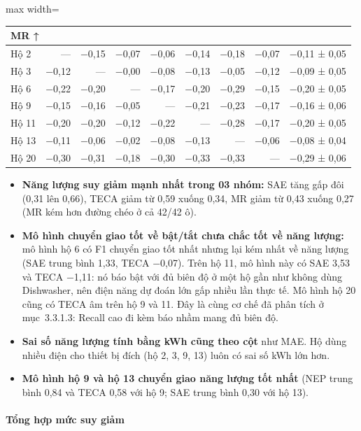 \begin{table}[H]
\begin{adjustbox}{max width=\linewidth}
\begin{tabular}{|l|r|r|r|r|r|r|r|r|}
\multicolumn{9}{|l|}{\textbf{MR ↑}} \\ \hline
Hộ 2 & — & −0,15 & −0,07 & −0,06 & −0,14 & −0,18 & −0,07 & −0,11 ± 0,05 \\ \hline
Hộ 3 & −0,12 & — & −0,00 & −0,08 & −0,13 & −0,05 & −0,12 & −0,09 ± 0,05 \\ \hline
Hộ 6 & −0,22 & −0,20 & — & −0,17 & −0,20 & −0,29 & −0,15 & −0,20 ± 0,05 \\ \hline
Hộ 9 & −0,15 & −0,16 & −0,05 & — & −0,21 & −0,23 & −0,17 & −0,16 ± 0,06 \\ \hline
Hộ 11 & −0,20 & −0,20 & −0,12 & −0,22 & — & −0,28 & −0,17 & −0,20 ± 0,05 \\ \hline
Hộ 13 & −0,11 & −0,06 & −0,02 & −0,08 & −0,13 & — & −0,06 & −0,08 ± 0,04 \\ \hline
Hộ 20 & −0,30 & −0,31 & −0,18 & −0,30 & −0,33 & −0,33 & — & −0,29 ± 0,06 \\ \hline
\end{tabular}
\end{adjustbox}
\end{table}

\begin{itemize}
\item \textbf{Năng lượng suy giảm mạnh nhất trong 03 nhóm:} SAE tăng gấp đôi (0,31 lên 0,66), TECA giảm từ 0,59 xuống 0,34, MR giảm từ 0,43 xuống 0,27 (MR kém hơn đường chéo ở cả 42/42 ô).
\item \textbf{Mô hình chuyển giao tốt về bật/tắt chưa chắc tốt về năng lượng:} mô hình hộ 6 có F1 chuyển giao tốt nhất nhưng lại kém nhất về năng lượng (SAE trung bình 1,33, TECA −0,07). Trên hộ 11, mô hình này có SAE 3,53 và TECA −1,11: nó báo bật với đủ biên độ ở một hộ gần như không dùng Dishwasher, nên điện năng dự đoán lớn gấp nhiều lần thực tế. Mô hình hộ 20 cũng có TECA âm trên hộ 9 và 11. Đây là cùng cơ chế đã phân tích ở mục~3.3.1.3: Recall cao đi kèm báo nhầm mang đủ biên độ.
\item \textbf{Sai số năng lượng tính bằng kWh cũng theo cột} như MAE. Hộ dùng nhiều điện cho thiết bị đích (hộ 2, 3, 9, 13) luôn có sai số kWh lớn hơn.
\item \textbf{Mô hình hộ 9 và hộ 13 chuyển giao năng lượng tốt nhất} (NEP trung bình 0,84 và TECA 0,58 với hộ 9; SAE trung bình 0,30 với hộ 13).
\end{itemize}

\paragraph{Tổng hợp mức suy giảm}


